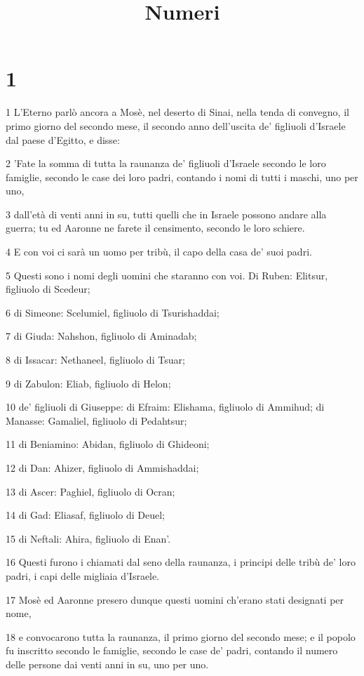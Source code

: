 

\title{Numeri}


\chapter{1}

\par 1 L'Eterno parlò ancora a Mosè, nel deserto di Sinai, nella tenda di convegno, il primo giorno del secondo mese, il secondo anno dell'uscita de' figliuoli d'Israele dal paese d'Egitto, e disse:
\par 2 'Fate la somma di tutta la raunanza de' figliuoli d'Israele secondo le loro famiglie, secondo le case dei loro padri, contando i nomi di tutti i maschi, uno per uno,
\par 3 dall'età di venti anni in su, tutti quelli che in Israele possono andare alla guerra; tu ed Aaronne ne farete il censimento, secondo le loro schiere.
\par 4 E con voi ci sarà un uomo per tribù, il capo della casa de' suoi padri.
\par 5 Questi sono i nomi degli uomini che staranno con voi. Di Ruben: Elitsur, figliuolo di Scedeur;
\par 6 di Simeone: Scelumiel, figliuolo di Tsurishaddai;
\par 7 di Giuda: Nahshon, figliuolo di Aminadab;
\par 8 di Issacar: Nethaneel, figliuolo di Tsuar;
\par 9 di Zabulon: Eliab, figliuolo di Helon;
\par 10 de' figliuoli di Giuseppe: di Efraim: Elishama, figliuolo di Ammihud; di Manasse: Gamaliel, figliuolo di Pedahtsur;
\par 11 di Beniamino: Abidan, figliuolo di Ghideoni;
\par 12 di Dan: Ahizer, figliuolo di Ammishaddai;
\par 13 di Ascer: Paghiel, figliuolo di Ocran;
\par 14 di Gad: Eliasaf, figliuolo di Deuel;
\par 15 di Neftali: Ahira, figliuolo di Enan'.
\par 16 Questi furono i chiamati dal seno della raunanza, i principi delle tribù de' loro padri, i capi delle migliaia d'Israele.
\par 17 Mosè ed Aaronne presero dunque questi uomini ch'erano stati designati per nome,
\par 18 e convocarono tutta la raunanza, il primo giorno del secondo mese; e il popolo fu inscritto secondo le famiglie, secondo le case de' padri, contando il numero delle persone dai venti anni in su, uno per uno.
